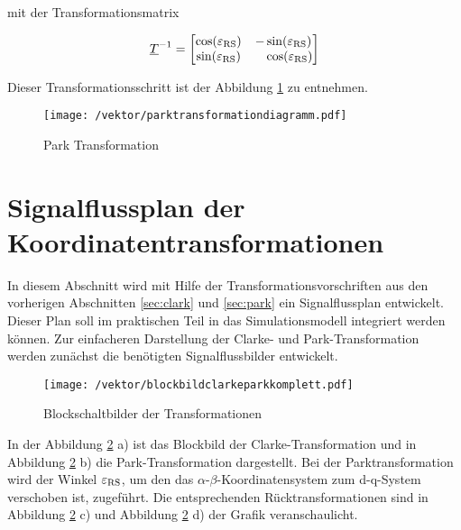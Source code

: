 mit der Transformationsmatrix

\begin{align}
	\underline{T}^{-1} =
	\begin{bmatrix}
		\cos({\varepsilon_{\mathrm{RS}}}) & -\sin({\varepsilon_{\mathrm{RS}}}) \\
		\sin({\varepsilon_{\mathrm{RS}}}) & ~~~\cos({\varepsilon_{\mathrm{RS}}})
	\end{bmatrix}
	\label{parkmatrixinvers}
\end{align}

Dieser Transformationsschritt ist der Abbildung \ref{fig:parktransformationdiagramm} zu entnehmen.


\begin{figure}[h]
	\centering
	\texttt{[image: /vektor/parktransformationdiagramm.pdf]}
	\label{fig:parktransformationdiagramm}
	\caption{Park Transformation}
\end{figure}

\newpage

\section{Signalflussplan der Koordinatentransformationen}\label{sec:signalflussplan}

In diesem Abschnitt wird mit Hilfe der Transformationsvorschriften aus den vorherigen Abschnitten \ref{sec:clark} und \ref{sec:park} ein Signalflussplan entwickelt.
Dieser Plan soll im praktischen Teil in das Simulationsmodell integriert werden können.
Zur einfacheren Darstellung der Clarke- und Park-Transformation werden zunächst die benötigten Signalflussbilder entwickelt.

\begin{figure}[h]
	\centering
	\texttt{[image: /vektor/blockbildclarkeparkkomplett.pdf]}
	\label{fig:blockbildclarkeparkkomplett}
	\caption{Blockschaltbilder der Transformationen}
\end{figure}

In der Abbildung \ref{fig:blockbildclarkeparkkomplett} a) ist das Blockbild der Clarke-Transformation und in Abbildung \ref{fig:blockbildclarkeparkkomplett} b) die Park-Transformation dargestellt. 
Bei der Parktransformation wird der Winkel $\varepsilon_{\mathrm{RS}}$, um den das $\alpha$-$\beta$-Koordinatensystem zum d-q-System verschoben ist, zugeführt.
Die entsprechenden Rücktransformationen sind in Abbildung \ref{fig:blockbildclarkeparkkomplett} c) und Abbildung \ref{fig:blockbildclarkeparkkomplett} d) der Grafik veranschaulicht.

